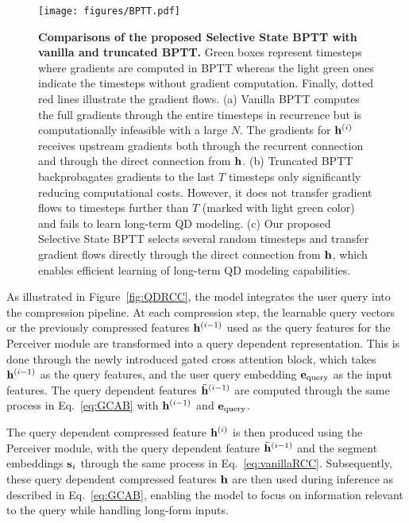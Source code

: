 \begin{figure*}[t]
    \centering  
    \texttt{[image: figures/BPTT.pdf]}
    \caption{
    \textbf{Comparisons of the proposed Selective State BPTT with vanilla and truncated BPTT.}
    Green boxes represent timesteps where gradients are computed in BPTT whereas the light green ones indicate the timesteps without gradient computation. 
    Finally, dotted red lines illustrate the gradient flows.
    (a) Vanilla BPTT computes the full gradients through the entire timesteps in recurrence but is computationally infeasible with a large $N$. The gradients for $\mathbf{h}^{(i)}$ receives upstream gradients both through the recurrent connection and through the direct connection from $\mathbf{h}$. 
    (b) Truncated BPTT backprobagates gradients to the last $T$ timesteps only significantly reducing computational costs.
    However, it does not transfer gradient flows to timesteps further than $T$ (marked with light green color) and fails to learn long-term QD modeling.
    (c) Our proposed Selective State BPTT selects several random timesteps and transfer gradient flows directly through the direct connection from $\mathbf{h}$, which enables efficient learning of long-term QD modeling capabilities.
    }
    \label{fig:bptt}
\end{figure*}

As illustrated in Figure~\ref{fig:QDRCC}, the model integrates the user query into the compression pipeline. At each compression step, the learnable query vectors or the previously compressed features $\mathbf{h}^{(i-1)}$ used as the query features for the Perceiver module are transformed into a query dependent representation. This is done through the newly introduced gated cross attention block, which takes $\mathbf{h}^{(i-1)}$ as the query features, and the user query embedding $\mathbf{e}_{\mathrm{query}}$ as the input features. The query dependent features $\Ddot{\mathbf{h}}^{(i-1)}$ are computed through the same process in Eq.~\eqref{eq:GCAB} with $\mathbf{h}^{(i-1)}$ and $\mathbf{e}_{\mathrm{query}}$.

The query dependent compressed feature $\mathbf{h}^{(i)}$ is then produced using the Perceiver module, with the query dependent feature $\Ddot{\mathbf{h}}^{(i-1)}$ and the segment embeddings $\mathbf{s}_i$ through the same process in Eq.~\eqref{eq:vanillaRCC}.
Subsequently, these query dependent compressed features $\mathbf{h}$ are then used during inference as described in Eq.~\eqref{eq:GCAB}, enabling the model to focus on information relevant to the query while handling long-form inputs.

